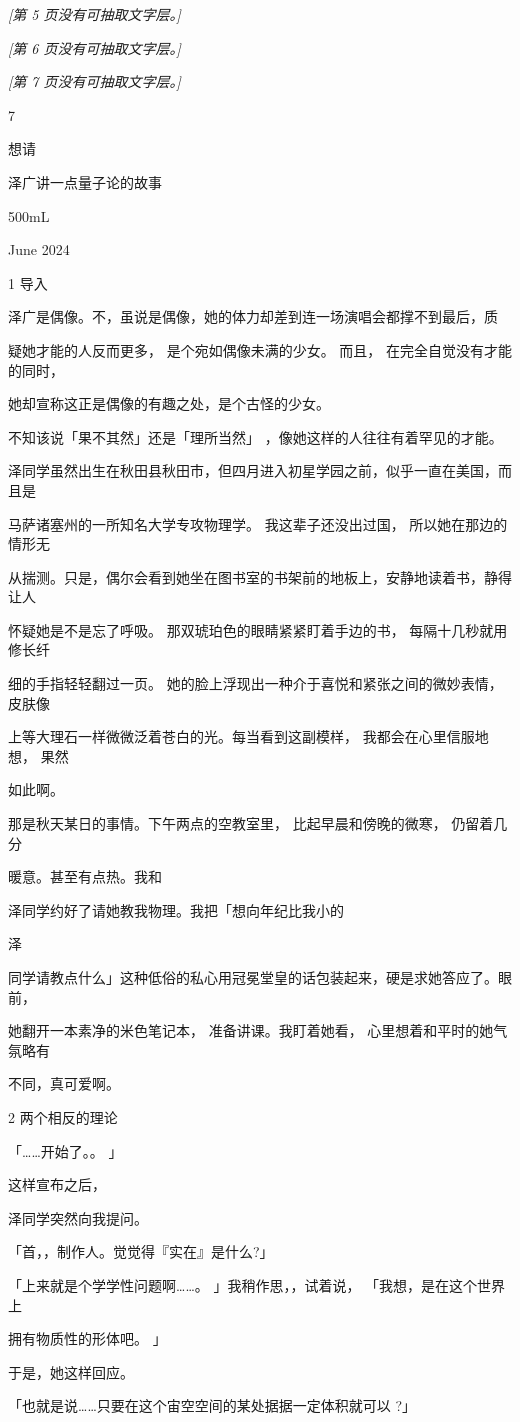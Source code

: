 \noindent\textit{[第 5 页没有可抽取文字层。]}\par

\noindent\textit{[第 6 页没有可抽取文字层。]}\par

\noindent\textit{[第 7 页没有可抽取文字层。]}\par

7\par
想请\par
泽广讲一点量子论的故事\par
500mL\par
June 2024\par
1 导入\par
泽广是偶像。不，虽说是偶像，她的体力却差到连一场演唱会都撑不到最后，质\par
疑她才能的人反而更多， 是个宛如偶像未满的少女。 而且， 在完全自觉没有才能的同时，\par
她却宣称这正是偶像的有趣之处，是个古怪的少女。\par
不知该说「果不其然」还是「理所当然」 ，像她这样的人往往有着罕见的才能。\par
泽同学虽然出生在秋田县秋田市，但四月进入初星学园之前，似乎一直在美国，而且是\par
马萨诸塞州的一所知名大学专攻物理学。 我这辈子还没出过国， 所以她在那边的情形无\par
从揣测。只是，偶尔会看到她坐在图书室的书架前的地板上，安静地读着书，静得让人\par
怀疑她是不是忘了呼吸。 那双琥珀色的眼睛紧紧盯着手边的书， 每隔十几秒就用修长纤\par
细的手指轻轻翻过一页。 她的脸上浮现出一种介于喜悦和紧张之间的微妙表情， 皮肤像\par
上等大理石一样微微泛着苍白的光。每当看到这副模样， 我都会在心里信服地想， 果然\par
如此啊。\par
那是秋天某日的事情。下午两点的空教室里， 比起早晨和傍晚的微寒， 仍留着几分\par
暖意。甚至有点热。我和\par
泽同学约好了请她教我物理。我把「想向年纪比我小的\par
泽\par
同学请教点什么」这种低俗的私心用冠冕堂皇的话包装起来，硬是求她答应了。眼前，\par
她翻开一本素净的米色笔记本， 准备讲课。我盯着她看， 心里想着和平时的她气氛略有\par
不同，真可爱啊。\par
2 两个相反的理论\par
「……开始了。。 」\par
这样宣布之后，\par
泽同学突然向我提问。\par
「首，，制作人。觉觉得『实在』是什么?」\par
「上来就是个学学性问题啊……。 」我稍作思，，试着说， 「我想，是在这个世界上\par
拥有物质性的形体吧。 」\par
于是，她这样回应。\par
「也就是说……只要在这个宙空空间的某处据据一定体积就可以 ?」\par

